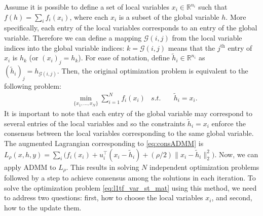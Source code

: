 \documentclass[letterpaper]{article} %
\DeclareMathOperator*{\argmin}{argmin}
\newcommand{\attn}[1]{\textcolor{red}{TODO: #1}}
\newcommand{\norm}[1]{\left\lVert #1 \right\rVert}
\begin{document}
Assume it is possible to define a set of local variables
$x_i \in \mathbb{R}^{n_i}$ such that $f(h)=\sum_i f_i(x_i)$, where
each $x_i$ is a subset of the global variable $h$. More specifically,
each entry of the local variables corresponds to an entry of the
global variable. Therefore we can define a mapping $\mathscr{G}(i,j)$
from the local variable indices into the global variable indices:
$k=\mathscr{G}(i,j)$ means that the $j^\text{th}$ entry of $x_i$ is
$h_k$ (or $(x_i)_j=h_k$). For ease of notation, define $\tilde{h}_i
\in \mathbb{R}^{n_i}$ as $(\tilde{h}_i)_j=h_{\mathscr{G}(i,j)}$. Then,
the original optimization problem is equivalent to the following
problem:  
\begin{equation}
\begin{aligned}
&\min_{\{x_1,...,x_N  \}} \sum_{i=1}^N f_i(x_i) &
s.t. &\quad \tilde{h}_i=x_i.
\end{aligned}
\label{eq:consADMM}
\end{equation}
It is important to note that each entry of the global variable may
correspond to several entries of the local variables and so the
constraints $\tilde{h}_i=x_i$ enforce the consensus between the local
variables corresponding to the same global variable.  
The augmented Lagrangian corresponding to 
\eqref{eq:consADMM} is $L_\rho(x,h,y)=\sum_i
\big(f_i(x_i)+u_i^\top(x_i-\tilde{h}_i) + (\rho/2) \lVert
x_i-\tilde{h}_i \lVert_2^2 \big)$. Now, we can apply ADMM to
$L_\rho$. This results in solving $N$ independent optimization
problems followed by a step to achieve consensus among the solutions
in each iteration. 
To solve the optimization problem \eqref{eq:l1tf_var_st_mat} using
this method, we need to address two 
questions: first, how to choose the 
local variables $x_i$, and second, how to the update them.
\end{document}

